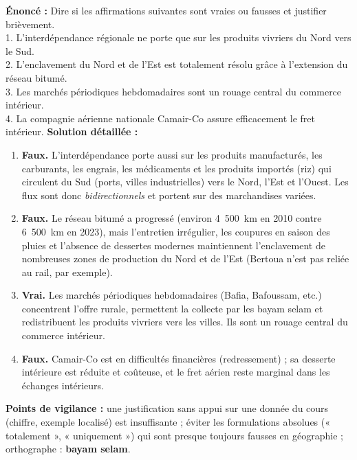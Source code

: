 \documentclass[11pt]{article}
\begin{document}
\begin{corrige}
\textbf{Énoncé :} Dire si les affirmations suivantes sont vraies ou fausses et justifier brièvement.\\
1. L'interdépendance régionale ne porte que sur les produits vivriers du Nord vers le Sud.\\
2. L'enclavement du Nord et de l'Est est totalement résolu grâce à l'extension du réseau bitumé.\\
3. Les marchés périodiques hebdomadaires sont un rouage central du commerce intérieur.\\
4. La compagnie aérienne nationale Camair-Co assure efficacement le fret intérieur.
\tcblower
\textbf{Solution détaillée :}
\begin{enumerate}
    \item \textbf{Faux.} L'interdépendance porte aussi sur les produits manufacturés, les carburants, les engrais, les médicaments et les produits importés (riz) qui circulent du Sud (ports, villes industrielles) vers le Nord, l'Est et l'Ouest. Les flux sont donc \emph{bidirectionnels} et portent sur des marchandises variées.
    \item \textbf{Faux.} Le réseau bitumé a progressé (environ 4~500~km en 2010 contre 6~500~km en 2023), mais l'entretien irrégulier, les coupures en saison des pluies et l'absence de dessertes modernes maintiennent l'enclavement de nombreuses zones de production du Nord et de l'Est (Bertoua n'est pas reliée au rail, par exemple).
    \item \textbf{Vrai.} Les marchés périodiques hebdomadaires (Bafia, Bafoussam, etc.) concentrent l'offre rurale, permettent la collecte par les bayam selam et redistribuent les produits vivriers vers les villes. Ils sont un rouage central du commerce intérieur.
    \item \textbf{Faux.} Camair-Co est en difficultés financières (redressement) ; sa desserte intérieure est réduite et coûteuse, et le fret aérien reste marginal dans les échanges intérieurs.
\end{enumerate}

\textbf{Points de vigilance :} une justification sans appui sur une donnée du cours (chiffre, exemple localisé) est insuffisante ; éviter les formulations absolues (« totalement », « uniquement ») qui sont presque toujours fausses en géographie ; orthographe : \textbf{bayam selam}.
\end{corrige}
\end{document}
